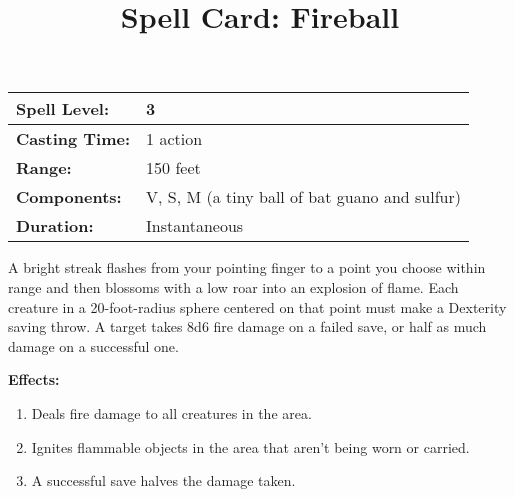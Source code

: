 
\title{Spell Card: Fireball}
\author{}
\date{}

\begin{tcolorbox}[colback=orange!5!white, colframe=orange!75!black, title=Fireball]
	\begin{tabular}{ll}
		\toprule
		\textbf{Spell Level:}  & 3                                             \\ \midrule
		\textbf{Casting Time:} & 1 action                                      \\ \midrule
		\textbf{Range:}        & 150 feet                                      \\ \midrule
		\textbf{Components:}   & V, S, M (a tiny ball of bat guano and sulfur) \\ \midrule
		\textbf{Duration:}     & Instantaneous                                 \\ \bottomrule
	\end{tabular}
	
	
	A bright streak flashes from your pointing finger to a point you choose within range and then blossoms with a low roar into an explosion of flame. Each creature in a 20-foot-radius sphere centered on that point must make a Dexterity saving throw. A target takes 8d6 fire damage on a failed save, or half as much damage on a successful one.
	
	\textbf{Effects:}
	\begin{enumerate}
		\item Deals fire damage to all creatures in the area.
		\item Ignites flammable objects in the area that aren't being worn or carried.
		\item A successful save halves the damage taken.
	\end{enumerate}
\end{tcolorbox}
